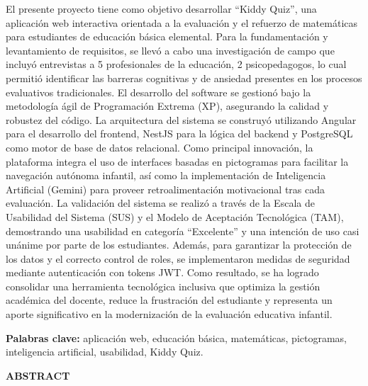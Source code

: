 \documentclass[12pt,a4paper,oneside]{report}
\begin{document}
\justifying
El presente proyecto tiene como objetivo desarrollar ``Kiddy Quiz'', una aplicación web interactiva orientada a la evaluación y el refuerzo de matemáticas para estudiantes de educación básica elemental. Para la fundamentación y levantamiento de requisitos, se llevó a cabo una investigación de campo que incluyó entrevistas a 5 profesionales de la educación, 2 psicopedagogos, lo cual permitió identificar las barreras cognitivas y de ansiedad presentes en los procesos evaluativos tradicionales. El desarrollo del software se gestionó bajo la metodología ágil de Programación Extrema (XP), asegurando la calidad y robustez del código. La arquitectura del sistema se construyó utilizando Angular para el desarrollo del frontend, NestJS para la lógica del backend y PostgreSQL como motor de base de datos relacional. Como principal innovación, la plataforma integra el uso de interfaces basadas en pictogramas para facilitar la navegación autónoma infantil, así como la implementación de Inteligencia Artificial (Gemini) para proveer retroalimentación motivacional tras cada evaluación. La validación del sistema se realizó a través de la Escala de Usabilidad del Sistema (SUS) y el Modelo de Aceptación Tecnológica (TAM), demostrando una usabilidad en categoría ``Excelente'' y una intención de uso casi unánime por parte de los estudiantes. Además, para garantizar la protección de los datos y el correcto control de roles, se implementaron medidas de seguridad mediante autenticación con tokens JWT. Como resultado, se ha logrado consolidar una herramienta tecnológica inclusiva que optimiza la gestión académica del docente, reduce la frustración del estudiante y representa un aporte significativo en la modernización de la evaluación educativa infantil.

\vspace{0.5cm}

\noindent\textbf{Palabras clave:} aplicación web, educación básica, matemáticas, pictogramas, inteligencia artificial, usabilidad, Kiddy Quiz.

\newpage

\begin{center}
    \vspace*{0.5cm}
    {\bfseries ABSTRACT}
\end{center}
\vspace{0.8cm}
\end{document}
